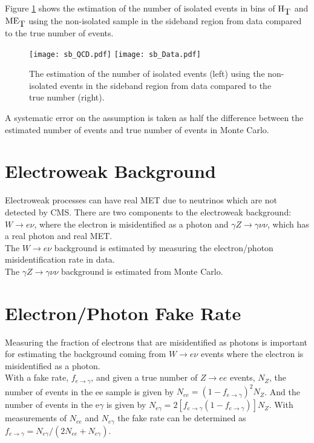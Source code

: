 Figure \ref{fig:Bkgd_Est_Sideband} shows the estimation of the number of
isolated events in bins of $\mbox{H}_{\mbox{T}}$ and $\mbox{ME}_{\mbox{T}}$ using the non-isolated sample in the
sideband region from data compared to the true number of events. \\

\begin{figure}
\texttt{[image: sb\_QCD.pdf]}
\texttt{[image: sb\_Data.pdf]}
\caption{The estimation of the number of isolated events (left) using the
non-isolated events in the sideband region from data compared to the true number
(right).}
\label{fig:Bkgd_Est_Sideband}
\end{figure}

A systematic error on the assumption is taken as half the difference between the
estimated number of events and true number of events in Monte Carlo.

\section{Electroweak Background}

Electroweak processes can have real MET due to neutrinos which are not
detected by CMS. There are two components to the electroweak background:
$W\rightarrow e\nu$, where the electron is misidentified as a photon and 
$\gamma Z\rightarrow\gamma\nu\nu$, which has a real photon and real MET. \\

The $W\rightarrow e\nu$ background is estimated by measuring the electron/photon
misidentification rate in data. \\

The $\gamma Z\rightarrow\gamma\nu\nu$ background is estimated from Monte Carlo.

\section{Electron/Photon Fake Rate}

Measuring the fraction of electrons that are misidentified as photons is
important for estimating the background coming from $W\rightarrow e\nu$ events
where the electron is misidentified as a photon. \\

With a fake rate, $f_{e\rightarrow\gamma}$, and given a true number of
$Z\rightarrow ee$ events, $N_{Z}$, the number of events in the ee sample is
given by $N_{ee} = (1 - f_{e\rightarrow\gamma})^{2}N_{Z}$. And the number of
events in the e$\gamma$ is given by $N_{e\gamma} = 2[f_{e\rightarrow\gamma}(1 -
f_{e\rightarrow\gamma})]N_{Z}$. With measurements of $N_{ee}$ and $N_{e\gamma}$
the fake rate can be determined as $f_{e\rightarrow\gamma} =
N_{e\gamma}/(2N_{ee} + N_{e\gamma})$. \\

